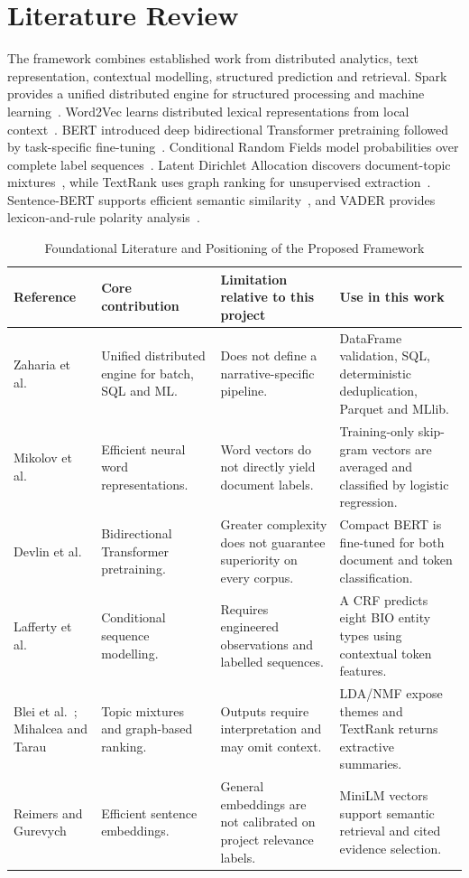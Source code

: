 \documentclass[conference]{IEEEtran}
\begin{document}
\section{Literature Review}

The framework combines established work from distributed analytics, text representation, contextual modelling, structured prediction and retrieval. Spark provides a unified distributed engine for structured processing and machine learning~\cite{zaharia2016spark}. Word2Vec learns distributed lexical representations from local context~\cite{mikolov2013}. BERT introduced deep bidirectional Transformer pretraining followed by task-specific fine-tuning~\cite{devlin2019}. Conditional Random Fields model probabilities over complete label sequences~\cite{lafferty2001}. Latent Dirichlet Allocation discovers document-topic mixtures~\cite{blei2003}, while TextRank uses graph ranking for unsupervised extraction~\cite{mihalcea2004}. Sentence-BERT supports efficient semantic similarity~\cite{reimers2019}, and VADER provides lexicon-and-rule polarity analysis~\cite{hutto2014}.

\begin{table}[t]
\centering
\caption{Foundational Literature and Positioning of the Proposed Framework}
\label{tab:litreview}
\renewcommand{\arraystretch}{1.25}
\small
\begin{tabularx}{\textwidth}{|p{2.5cm}|X|X|X|}
\hline
\textbf{Reference} & \textbf{Core contribution} & \textbf{Limitation relative to this project} & \textbf{Use in this work}\\
\hline
Zaharia et al.~\cite{zaharia2016spark} & Unified distributed engine for batch, SQL and ML. & Does not define a narrative-specific pipeline. & DataFrame validation, SQL, deterministic deduplication, Parquet and MLlib.\\
\hline
Mikolov et al.~\cite{mikolov2013} & Efficient neural word representations. & Word vectors do not directly yield document labels. & Training-only skip-gram vectors are averaged and classified by logistic regression.\\
\hline
Devlin et al.~\cite{devlin2019} & Bidirectional Transformer pretraining. & Greater complexity does not guarantee superiority on every corpus. & Compact BERT is fine-tuned for both document and token classification.\\
\hline
Lafferty et al.~\cite{lafferty2001} & Conditional sequence modelling. & Requires engineered observations and labelled sequences. & A CRF predicts eight BIO entity types using contextual token features.\\
\hline
Blei et al.~\cite{blei2003}; Mihalcea and Tarau~\cite{mihalcea2004} & Topic mixtures and graph-based ranking. & Outputs require interpretation and may omit context. & LDA/NMF expose themes and TextRank returns extractive summaries.\\
\hline
Reimers and Gurevych~\cite{reimers2019} & Efficient sentence embeddings. & General embeddings are not calibrated on project relevance labels. & MiniLM vectors support semantic retrieval and cited evidence selection.\\
\hline
\end{tabularx}
\end{table}
\end{document}
